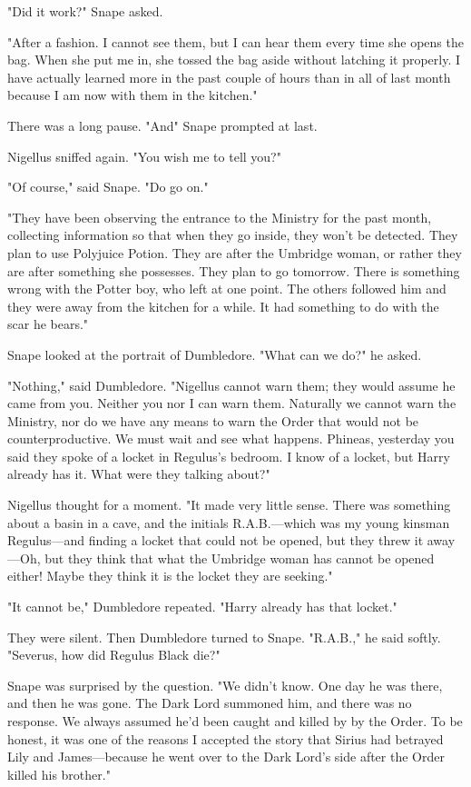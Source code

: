 "Did it work?" Snape asked.

"After a fashion. I cannot see them, but I can hear them every time she opens the bag. When she put me in, she tossed the bag aside without latching it properly. I have actually learned more in the past couple of hours than in all of last month because I am now with them in the kitchen."

There was a long pause. "And{\el}" Snape prompted at last.

Nigellus sniffed again. "You wish me to tell you?"

"Of course," said Snape. "Do go on."

"They have been observing the entrance to the Ministry for the past month, collecting information so that when they go inside, they won't be detected. They plan to use Polyjuice Potion. They are after the Umbridge woman, or rather they are after something she possesses. They plan to go tomorrow. There is something wrong with the Potter boy, who left at one point. The others followed him and they were away from the kitchen for a while. It had something to do with the scar he bears."

Snape looked at the portrait of Dumbledore. "What can we do?" he asked.

"Nothing," said Dumbledore. "Nigellus cannot warn them; they would assume he came from you. Neither you nor I can warn them. Naturally we cannot warn the Ministry, nor do we have any means to warn the Order that would not be counterproductive. We must wait and see what happens. Phineas, yesterday you said they spoke of a locket in Regulus's bedroom. I know of a locket, but Harry already has it. What were they talking about?"

Nigellus thought for a moment. "It made very little sense. There was something about a basin in a cave, and the initials R.A.B.—which was my young kinsman Regulus—and finding a locket that could not be opened, but they threw it away—Oh, but they think that what the Umbridge woman has cannot be opened either! Maybe they think it is the locket they are seeking."

"It cannot be," Dumbledore repeated. "Harry already has that locket."

They were silent. Then Dumbledore turned to Snape. "R.A.B.," he said softly. "Severus, how did Regulus Black die?"

Snape was surprised by the question. "We didn't know. One day he was there, and then he was gone. The Dark Lord summoned him, and there was no response. We always assumed he'd been caught and killed by{\el} by the Order. To be honest, it was one of the reasons I accepted the story that Sirius had betrayed Lily and James—because he went over to the Dark Lord's side after the Order killed his brother."

